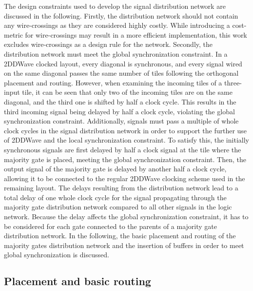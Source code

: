 The design constraints used to develop the signal distribution network are discussed in the following. Firstly, the distribution network should not contain any wire-crossings as they are considered highly costly. While introducing a cost-metric for wire-crossings may result in a more efficient implementation, this work excludes wire-crossings as a design rule for the network. Secondly, the distribution network must meet the global synchronization constraint. In a 2DDWave clocked layout, every diagonal is synchronous, and every signal wired on the same diagonal passes the same number of tiles following the orthogonal placement and routing. However, when examining the incoming tiles of a three-input tile, it can be seen that only two of the incoming tiles are on the same diagonal, and the third one is shifted by half a clock cycle. This results in the third incoming signal being delayed by half a clock cycle, violating the global synchronization constraint. Additionally, signals must pass a multiple of whole clock cycles in the signal distribution network in order to support the further use of 2DDWave and the local synchronization constraint. To satisfy this, the initially synchronous signals are first delayed by half a clock signal at the tile where the majority gate is placed, meeting the global synchronization constraint. Then, the output signal of the majority gate is delayed by another half a clock cycle, allowing it to be connected to the regular 2DDWave clocking scheme used in the remaining layout. The delays resulting from the distribution network lead to a total delay of one whole clock cycle for the signal propagating through the majority gate distribution network compared to all other signals in the logic network. Because the delay affects the global synchronization constraint, it has to be considered for each gate connected to the parents of a majority gate distribution network. In the following, the basic placement and routing of the majority gates distribution network and the insertion of buffers in order to meet global synchronization is discussed.

\subsection{Placement and basic routing}

